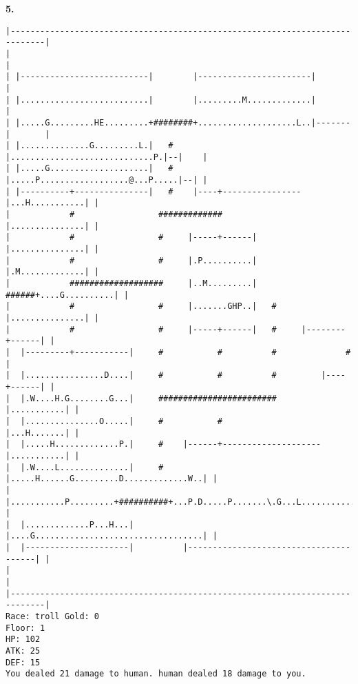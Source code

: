 \documentclass[11pt]{article}
\theoremstyle{plain}
\begin{document}
\newpage
\textbf{5. }
\begin{Verbatim}[fontsize=\scriptsize]
|-----------------------------------------------------------------------------|
|                                                                             |
| |--------------------------|        |-----------------------|               |
| |..........................|        |.........M.............|               |
| |.....G.........HE.........+########+....................L..|-------|       |
| |..............G.........L.|   #    |.............................P.|--|    |
| |.....G....................|   #    |.....P..................@...P.....|--| |
| |----------+---------------|   #    |----+----------------|...H...........| |
|            #                 #############                |...............| |
|            #                 #     |-----+------|         |...............| |
|            #                 #     |.P..........|         |.M.............| |
|            ###################     |..M.........|   ######+....G..........| |
|            #                 #     |.......GHP..|   #     |...............| |
|            #                 #     |-----+------|   #     |--------+------| |
|  |---------+-----------|     #           #          #              #        |
|  |................D....|     #           #          #         |----+------| |
|  |.W....H.G........G...|     ########################         |...........| |
|  |...............O.....|     #           #                    |...H.......| |
|  |.....H.............P.|     #    |------+--------------------|...........| |
|  |.W....L..............|     #    |.....H......G.........D.............W..| |
|  |...........P.........+##########+...P.D.....P.......\.G...L.............| |
|  |.............P...H...|          |....G..................................| |
|  |---------------------|          |---------------------------------------| |
|                                                                             |
|-----------------------------------------------------------------------------|
Race: troll Gold: 0                                                    Floor: 1
HP: 102
ATK: 25
DEF: 15
You dealed 21 damage to human. human dealed 18 damage to you. 
\end{Verbatim}
\end{document}
